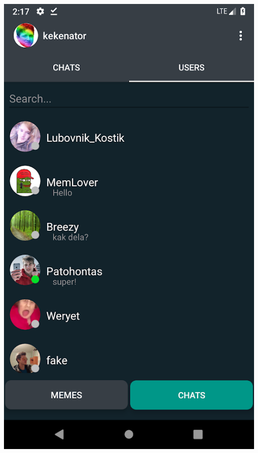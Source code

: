 \documentclass[xetex,mathserif,serif, xcolor=table]{beamer}
\begin{document}
\begin{frame}
\begin{columns}[t]
                    \includegraphics[scale=0.179]{images/chats.png}

\end{columns}
\end{frame}
\end{document}
